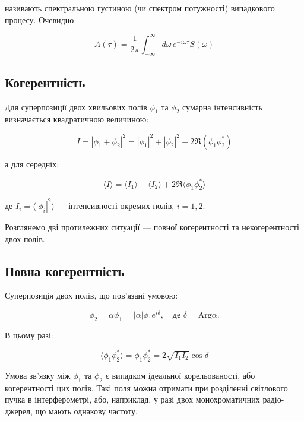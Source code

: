 називають спектральною густиною (чи спектром потужності) випадкового процесу. Очевидно

\begin{equation*}
A(\tau) = \frac{1}{2\pi} \int_{-\infty}^{\infty} d\omega \, e^{-i\omega \tau} S(\omega)
\end{equation*}

\subsection*{Когерентність}

Для суперпозиції двох хвильових полів \(\phi_1\) та \(\phi_2\) сумарна інтенсивність визначається квадратичною величиною:

\begin{equation*}
I = |\phi_1 + \phi_2|^2 = |\phi_1|^2 + |\phi_2|^2 + 2 \Re(\phi_1 \phi_2^{*})
\end{equation*}

а для середніх:

\begin{equation}
\langle I \rangle = \langle I_1 \rangle + \langle I_2 \rangle + 2 \Re \langle \phi_1 \phi_2^{*} \rangle
\label{eq:intensity}
\end{equation}

де \( I_i = \langle |\phi_i|^2 \rangle \) --- інтенсивності окремих полів, \( i = 1, 2 \).

Розглянемо дві протилежних ситуації --- повної когерентності та некогерентності двох полів.

\subsection*{Повна когерентність}

Суперпозиція двох полів, що пов’язані умовою:

\begin{equation*}
\phi_2 = \alpha \phi_1 = |\alpha| \phi_1 e^{i\delta}, \quad \text{де } \delta = \text{Arg} \alpha.
\end{equation*}

В цьому разі:

\begin{equation*}
\langle \phi_1 \phi_2^{*} \rangle = \phi_1 \phi_2^{*} = 2\sqrt{I_1 I_2} \cos \delta
\end{equation*}

Умова зв’язку між \(\phi_1\) та \(\phi_2\) є випадком ідеальної корельованості, або когерентності цих полів. Такі поля можна отримати при розділенні
світлового пучка в інтерферометрі, або, наприклад, у разі двох монохроматичних радіо-джерел, що мають однакову частоту.

